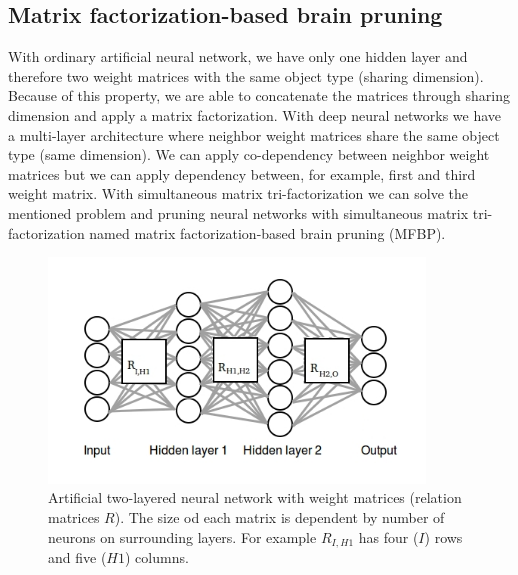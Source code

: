 \documentclass{article} %
\begin{document}
\subsection{Matrix factorization-based brain pruning}
With ordinary artificial neural network, we have only one hidden layer and 
therefore two weight matrices with the same object type (sharing dimension). 
Because of this property, we are able to concatenate the matrices through 
sharing dimension and apply a matrix factorization. With deep neural networks we 
have a multi-layer architecture where neighbor weight matrices share the same 
object type (same dimension).  We can apply co-dependency between neighbor 
weight matrices but we can apply dependency between, for example, first and 
third weight matrix. With simultaneous matrix tri-factorization we can solve the 
mentioned problem and pruning neural networks with simultaneous matrix 
tri-factorization named matrix factorization-based brain pruning (MFBP).

\begin{figure}[!ht]
\centering
\includegraphics[width=10cm]{mrezafusion.jpg}
\caption{Artificial two-layered neural network with weight matrices (relation 
matrices $R$).
The size od each matrix is dependent by number of neurons on surrounding layers. 
For example $R_{I,H1}$ has four ($I$) rows and five ($H1$) columns.}
\label{f:mrezafusion}
\end{figure}
\end{document}
